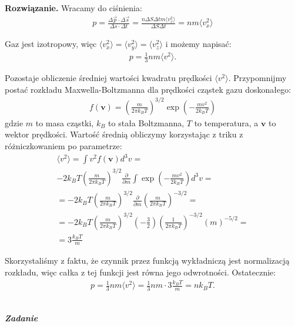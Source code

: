 \documentclass[11pt,a4paper]{article}
\newcounter{zadanie}\newcommand{\zadanie}[1][]{\addtocounter{zadanie}{1} ~\\  {\bf \emph{Zadanie \arabic{zadanie} #1 }} \\}
\newenvironment{solution}{\vspace{1cm} \par\textbf{Rozwiązanie.} \vspace{1cm}}{}
\begin{document}
\begin{solution}
Wracamy do ciśnienia:
\begin{align*}
  p = \frac{\Delta \vec{p} \cdot \Delta \vec{s}}{\Delta s \cdot \Delta t} = \frac{n\Delta S \Delta t m \langle v_x^2 \rangle}{\Delta S \Delta t} = n m \langle v_x^2 \rangle
\end{align*}

Gaz jest izotropowy, więc $\langle v_x^2 \rangle = \langle v_y^2 \rangle = \langle v_z^2 \rangle$ i możemy napisać:
\begin{align*}
  p = \frac{1}{3} n m \langle v^2 \rangle.
\end{align*}

Pozostaje obliczenie średniej wartości kwadratu prędkości $\langle v^2 \rangle$.
Przypomnijmy postać rozkładu Maxwella-Boltzmanna dla prędkości cząstek gazu doskonałego:
\begin{align*}
  f(\mathbf{v}) = \left( \frac{m}{2\pi k_B T} \right)^{3/2} 
                   \exp\left( -\frac{m v^2}{2 k_B T} \right)
\end{align*}
gdzie $m$ to masa cząstki, $k_B$ to stała Boltzmanna, $T$ to temperatura, 
a $\mathbf{v}$ to wektor prędkości. Wartość średnią obliczymy korzystając 
z triku z różniczkowaniem po parametrze:
\begin{align*}
  \langle v^2 \rangle = \int v^2 f(\mathbf{v}) d^3v = \\
 - 2 k_BT \left( \frac{m}{2\pi k_B T} \right)^{3/2} \frac{\partial}{\partial m} \int \exp\left( -\frac{m v^2}{2 k_B T} \right) d^3v = \\
  = -2 k_BT \left( \frac{m}{2\pi k_B T} \right)^{3/2} \frac{\partial}{\partial m} \left( \frac{m}{2\pi k_B T} \right)^{-3/2} = \\
  = -2 k_BT \left( \frac{m}{2\pi k_B T} \right)^{3/2} \left( -\frac{3}{2} \right) \left( \frac{1}{2\pi k_B T}\right)^{-3/2}  \left( m \right)^{-5/2} = \\
  = 3 \frac{k_B T}{m}
\end{align*}

Skorzystaliśmy z faktu, że czynnik przez funkcją wykładniczą jest normalizacją 
rozkładu, więc całka z tej funkcji jest równa jego odwrotności.
Ostatecznie:  
\begin{align*}
  p = \frac{1}{3} n m \langle v^2 \rangle = \frac{1}{3} n m \cdot 3 \frac{k_B T}{m} = n k_B T.
\end{align*}

\newpage
\end{solution}
\zadanie[]
\end{document}
